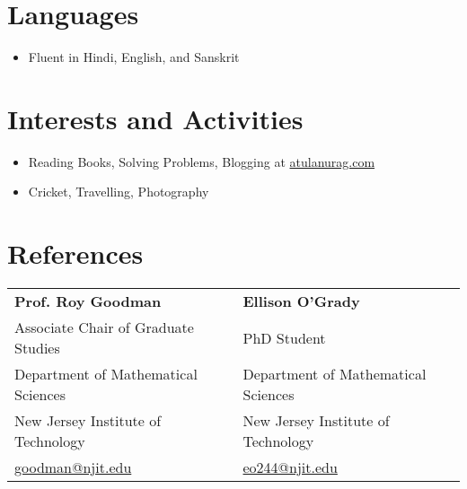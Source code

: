 \documentclass[11pt,a4paper]{article}
\begin{document}
\section*{Languages}
\begin{itemize}[noitemsep]
    \item Fluent in Hindi, English, and Sanskrit
\end{itemize}

\vspace{10pt}

\section*{Interests and Activities}
\begin{itemize}[noitemsep]
    \item Reading Books, Solving Problems, Blogging at \href{https://atulanurag.com/post/}{atulanurag.com}
    \item Cricket, Travelling, Photography
\end{itemize}

\vspace{10pt}

\section*{References}

\begin{tabular}{p{} p{}}

\textbf{Prof. Roy Goodman} &  \textbf{Ellison O'Grady} \\
Associate Chair of Graduate Studies & PhD Student \\
Department of Mathematical Sciences & Department of Mathematical Sciences \\
New Jersey Institute of Technology & New Jersey Institute of Technology \\
\href{mailto:goodman@njit.edu}{goodman@njit.edu} & \href{mailto:eo244@njit.edu}{eo244@njit.edu}\\

\end{tabular}
\end{document}
